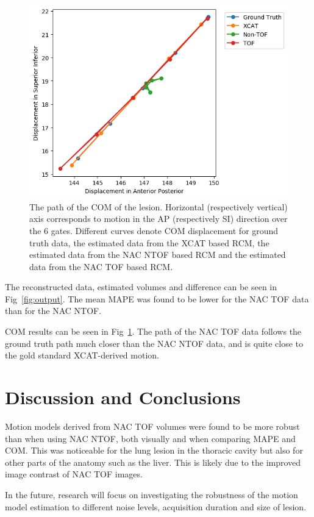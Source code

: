 \documentclass[10pt, twocolumn, twoside, letterpaper]{IEEEtran}
\begin{document}
    \begin{figure}[H]
        \centering
        \includegraphics[width=1.0\linewidth]{figures/TOF.png}
        \captionsetup{singlelinecheck=false, justification=centering}
        \caption{The path of the \gls{COM} of the lesion. Horizontal (respectively vertical) axis corresponds to motion in the \gls{AP} (respectively \gls{SI}) direction over the $6$ gates. Different curves denote \gls{COM} displacement for  ground truth data, the estimated data from the \gls{XCAT} based \gls{RCM}, the estimated data from the \gls{NAC} \gls{NTOF} based \gls{RCM} and the estimated data from the \gls{NAC} \gls{TOF} based \gls{RCM}.}
        \label{fig:com_graph}
    \end{figure}
    
     The reconstructed data, estimated volumes and difference can be seen in Fig~\ref{fig:output}. The mean \gls{MAPE} was found to be lower for the \gls{NAC} \gls{TOF} data than for the \gls{NAC} \gls{NTOF}.
    
     \gls{COM} results can be seen in Fig~\ref{fig:com_graph}. The path of the \gls{NAC} \gls{TOF} data follows the ground truth path much closer than the \gls{NAC} \gls{NTOF} data, and is quite close to the gold standard \gls{XCAT}-derived motion.

\section{Discussion and Conclusions} \label{sec:discussion_and_conclusions}
    Motion models derived from \gls{NAC} \gls{TOF} volumes were found to be more robust than when using \gls{NAC} \gls{NTOF}, both visually and when comparing \gls{MAPE} and \gls{COM}. This was noticeable for the lung lesion in the thoracic cavity but also for other parts of the anatomy such as the liver. This is likely due to the improved image contrast of \gls{NAC} \gls{TOF} images.
    
    In the future, research will focus on investigating the robustness of the motion model estimation to different noise levels, acquisition duration and size of lesion.

\AtNextBibliography{\scriptsize}
\printbibliography
\end{document}
